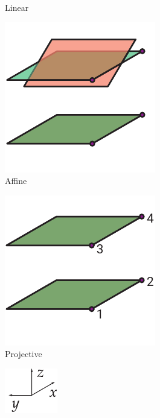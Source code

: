 \begin{figure}
\begin{subfigure}[t]{0.2\textwidth}
        \caption{Linear}
        \label{fig:geometry/linear}
    \end{subfigure}\hfill
    \begin{subfigure}[t]{0.2\textwidth}
        \centering
        \includegraphics{geometry/affine}
        \caption{Affine}
        \label{fig:geometry/affine}
    \end{subfigure}\hfill
    \begin{subfigure}[t]{0.2\textwidth}
        \centering
        \includegraphics{geometry/projective}
        \caption{Projective}
        \label{fig:geometry/projective}
    \end{subfigure}
    \begin{subfigure}[t]{0.05\textwidth}
        \centering
        \includegraphics{geometry/coordinates}
    \end{subfigure}

\end{figure}

